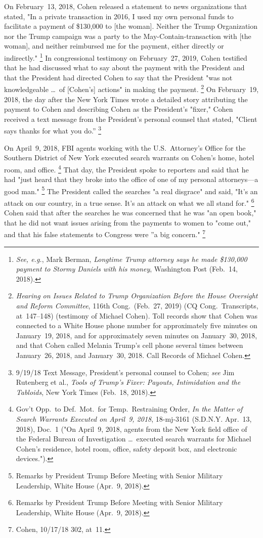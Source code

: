 On February~13, 2018, Cohen released a statement to news organizations that stated, "In a private transaction in 2016, I used my own personal funds to facilitate a payment of \$130,000 to [the woman].
Neither the Trump Organization nor the Trump campaign was a party to the May-Contain-transaction with [the woman], and neither reimbursed me for the payment, either directly or indirectly."%
\footnote{\textit{See, e.g.}, Mark Berman, \textit{Longtime Trump attorney says he made \$130,000 payment to Stormy Daniels with his money}, Washington Post (Feb.~14, 2018).}
In congressional testimony on February~27, 2019, Cohen testified that he had discussed what to say about the payment with the President and that the President had directed Cohen to say that the President "was not knowledgeable \dots\ of [Cohen's] actions" in making the payment.%
\footnote{\textit{Hearing on Issues Related to Trump Organization Before the House Oversight and Reform Committee}, 116th Cong.\ (Feb.~27, 2019) (CQ Cong.\ Transcripts, at~147--148) (testimony of Michael Cohen).
Toll records show that Cohen was connected to a White House phone number for approximately five minutes on January~19, 2018, and for approximately seven minutes on January~30, 2018, and that Cohen called Melania Trump's cell phone several times between January~26, 2018, and January~30, 2018.
Call Records of Michael Cohen.}
On February~19, 2018, the day after the New York Times wrote a detailed story attributing the payment to Cohen and describing Cohen as the President's "fixer," Cohen received a text message from the President's personal counsel that stated, "Client says thanks for what you do.''%
\footnote{9/19/18 Text Message, President's personal counsel to Cohen;
\textit{see} Jim Rutenberg et al., \textit{Tools of Trump's Fixer: Payouts, Intimidation and the Tabloids}, New York Times (Feb.~18, 2018).}

On April~9, 2018, FBI agents working with the U.S.~Attorney's Office for the Southern District of New York executed search warrants on Cohen's home, hotel room, and office.%
\footnote{Gov't Opp.\ to Def.\ Mot.\ for Temp.\ Restraining Order, \textit{In the Matter of Search Warrants Executed on April~9, 2018}, 18-mj-3161 (S.D.N.Y. Apr.~13, 2018), Doc.~1
("On April~9, 2018, agents from the New York field office of the Federal Bureau of Investigation \dots\ executed search warrants for Michael Cohen's residence, hotel room, office, safety deposit box, and electronic devices.").}
That day, the President spoke to reporters and said that he had "just heard that they broke into the office of one of my personal attorneys---a good man."%
\footnote{Remarks by President Trump Before Meeting with Senior Military Leadership, White House (Apr.~9, 2018).}
The President called the searches "a real disgrace" and said, "It's an attack on our country, in a true sense.
It's an attack on what we all stand for."%
\footnote{Remarks by President Trump Before Meeting with Senior Military Leadership, White House (Apr.~9, 2018).}
Cohen said that after the searches he was concerned that he was "an open book," that he did not want issues arising from the payments to women to "come out," and that his false statements to Congress were ''a big concern."%
\footnote{Cohen, 10/17/18 302, at~11.}

